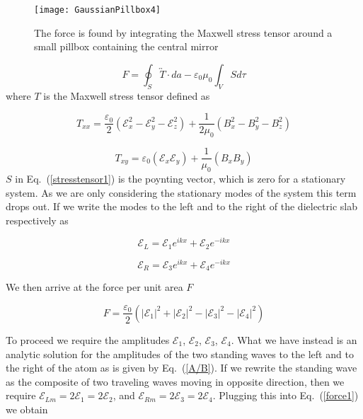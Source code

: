 \documentclass[twocolumn,english,pra,aps,superscriptaddress,floatfix]{revtex4-1}
\begin{document}
\begin{figure}
\texttt{[image: GaussianPillbox4]}
\caption{The force is found by integrating the Maxwell stress tensor around a small pillbox containing the central mirror}
\label{fig:gaussianpillbox}
\end{figure}

\begin{equation}
F=\oint_{S}\overleftrightarrow{T}\cdot da-\varepsilon_{0}\mu_{0}\int_{V}Sd\tau
\label{stresstensor1}
\end{equation}
where $T$ is the Maxwell stress tensor defined as

\begin{equation}
T_{xx}=\frac{\varepsilon_{0}}{2}\left(\mathcal{E}_{x}^{2}-\mathcal{E}_{y}^{2}-\mathcal{E}_{z}^{2}\right)+\frac{1}{2\mu_{0}}\left(B_{x}^{2}-B_{y}^{2}-B_{z}^{2}\right)
\label{stresstensor2}
\end{equation}


\begin{equation}
T_{xy}=\varepsilon_{0}\left(\mathcal{E}_{x}\mathcal{E}_{y}\right)+\frac{1}{\mu_{0}}\left(B_{x}B_{y}\right)
\label{stresstensor3}
\end{equation}
$S$ in Eq.\ (\ref{stresstensor1}) is the poynting vector, which is zero for a stationary system.  As we are only considering the stationary modes of the system this term drops out.
If we write the modes to the left and to the right of the dielectric
slab respectively as

\begin{equation}
\mathcal{E}_{L}=\mathcal{E}_{1}e^{ikx}+\mathcal{E}_{2}e^{-ikx}
\label{Efieldleft}
\end{equation}


\begin{equation}
\mathcal{E}_{R}=\mathcal{E}_{3}e^{ikx}+\mathcal{E}_{4}e^{-ikx}
\label{EfieldRight}
\end{equation}

We then arrive at the force per unit area $F$ 

\begin{equation}
F=\frac{\varepsilon_{0}}{2}\left(\left|\mathcal{E}_{1}\right|^{2}+\left|\mathcal{E}_{2}\right|^{2}-\left|\mathcal{E}_{3}\right|^{2}-\left|\mathcal{E}_{4}\right|^{2}\right)
\label{force1}
\end{equation}

To proceed we require the amplitudes $\mathcal{E}_{1}$, $\mathcal{E}_{2}$, $\mathcal{E}_{3}$, $\mathcal{E}_{4}$. What we have instead is an analytic solution for the amplitudes
of the two standing waves to the left and to the right of the atom as is given by Eq.\ (\ref{A/B}).
If we rewrite the standing wave as the composite of two traveling waves moving in opposite direction, then we require $\mathcal{E}_{Lm}=2\mathcal{E}_{1}=2\mathcal{E}_{2}$, and $\mathcal{E}_{Rm}=2\mathcal{E}_{3}=2\mathcal{E}_{4}$.
Plugging this into Eq.\ (\ref{force1}) we obtain
\end{document}
